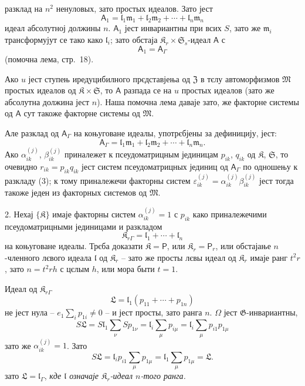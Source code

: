 \documentclass[11pt]{article}
\begin{document}
разклад на \(n^2\) ненуловых, зато простых идеалов. Зато јест
\[
\mathsf{A}_1=\mathfrak l_1\mathfrak m_1+\mathfrak l_2\mathfrak m_2+\cdots+\mathfrak l_n\mathfrak m_n
\]
идеал абсолутној должины \(n\). \(\mathsf{A}_1\) јест инвариантны при всих \(S\), зато же \(\mathfrak m_i\) трансформујут се тако како \(\mathfrak l_i\); зато обстаја \(\mathfrak K_r\times\mathfrak S_s\)-идеал \(\mathsf{A}\) с
\[
\mathsf{A}_1=\mathsf{A}_\Gamma
\]
(помочна лема, стр.~18).

Ако \(u\) јест ступењ иредуцибилного прєдставјења од \(\mathfrak Z\) в тєлу автоморфизмов \(\mathfrak M\) простых идеалов од \(\mathfrak K\times\mathfrak S\), то \(\mathsf{A}\) разпада се на \(u\) простых идеалов (зато же абсолутна должина јест \(n\)). Наша помочна лема даваје зато, же факторне системы од \(\mathsf{A}\) сут такоже факторне системы од \(\mathfrak M\).

Але разклад од \(\mathsf{A}_\Gamma\) на коњуговане идеалы, употрєбјены за дефиницију, јест:
\[
\tag{3}
\mathsf{A}_\Gamma=\mathfrak l_1\mathfrak m_1+\mathfrak l_2\mathfrak m_2+\cdots+\mathfrak l_n\mathfrak m_n.
\]
Ако \(\alpha_{ik}^{(j)}\), \(\beta_{ik}^{(j)}\) приналежет к псеудоматрицным јединицам \(p_{ik}\), \(q_{ik}\) од \(\mathfrak K\), \(\mathfrak S\), то очевидно \(r_{ik}=p_{ik}q_{ik}\) јест систем псеудоматрицных јединиц од \(\mathsf{A}_\Gamma\) по одношењу к разкладу (3); к тому приналежечи факторны систем \(\varepsilon_{ik}^{(j)}=\alpha_{ik}^{(j)}\beta_{ik}^{(j)}\) јест тогда такоже једен из факторных системов од \(\mathfrak M\).

2. Нехај \(\{\mathfrak K\}\) имаје факторны систем \(\alpha_{ik}^{(j)}=1\) с \(p_{ik}\) како приналежечими псеудоматрицными јединицами и разкладом
\[
\mathfrak K_{r\Gamma}=\mathfrak l_1+\cdots+\mathfrak l_n
\]
на коњуговане идеалы. Трєба доказати \(\mathfrak K=\mathsf P\), или \(\mathfrak K_r=\mathsf P_r\), или обстајање \(n\)-членного лєвого идеала \(\mathfrak l\) од \(\mathfrak K_r\) -- зато же просты лєвы идеал од \(\mathfrak K_r\) имаје ранг \(t^2r\), зато \(n=t^2rh\) с цєлым \(h\), или мора быти \(t=1\).

Идеал од \(\mathfrak K_{r\Gamma}\)
\[
\mathfrak L=\mathfrak l_1(p_{11}+\cdots+p_{1n})
\]
не јест нула -- \(e_1\sum_i p_{1i}\ne0\) -- и јест просты, зато ранга \(n\). \(\Omega\) јест \(\mathfrak G\)-инвариантны,
\[
S\mathfrak L
=S\mathfrak l_1\sum_\nu S p_{1\nu}
=\mathfrak l_i\sum_\mu p_{i\mu}
=\mathfrak l_i\sum_\mu p_{i1}p_{1\mu}
\]
зато же \(\alpha_{ik}^{(j)}=1\). Зато
\[
S\mathfrak L=\mathfrak l_ip_{i1}\sum_\mu p_{1\mu}
=\mathfrak l_1\sum_\mu p_{1\mu}
=\mathfrak L.
\]
зато \(\mathfrak L=\mathfrak l_\Gamma\), \emph{кде \(\mathfrak l\) означаје \(\mathfrak K_r\)-идеал \(n\)-того ранга.}
\end{document}

